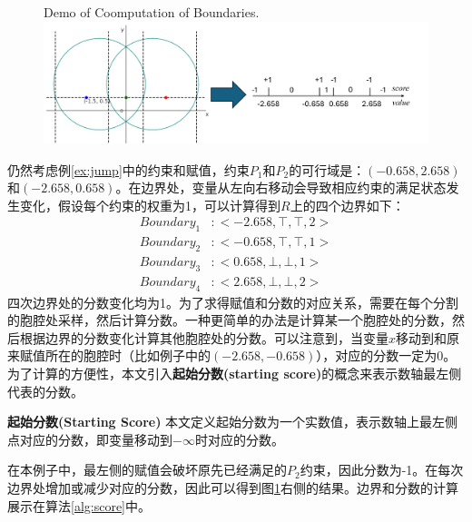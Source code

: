 \begin{example}
\label{ex:jump2}
\begin{figure}[t]
    \centering
     {Demo of Coomputation of Boundaries.}
    \includegraphics[width=\columnwidth]{Img/boundary.png}
\label{fig:boundary}
\end{figure}

仍然考虑例\ref{ex:jump}中的约束和赋值，约束$P_1$和$P_2$的可行域是：$(-0.658, 2.658)$和$(-2.658, 0.658)$。在边界处，变量从左向右移动会导致相应约束的满足状态发生变化，假设每个约束的权重为1，可以计算得到$R$上的四个边界如下：
\begin{align}
Boundary_1 &: <-2.658, \top, \top, 2> \nonumber \\
Boundary_2 &: <-0.658, \top, \top, 1> \nonumber \\
Boundary_3 &: <0.658, \bot, \bot, 1> \nonumber \\
Boundary_4 &: <2.658, \bot, \bot, 2> \nonumber
\end{align}
四次边界处的分数变化均为1。为了求得赋值和分数的对应关系，需要在每个分割的胞腔处采样，然后计算分数。一种更简单的办法是计算某一个胞腔处的分数，然后根据边界的分数变化计算其他胞腔处的分数。可以注意到，当变量$x$移动到和原来赋值所在的胞腔时（比如例子中的$(-2.658, -0.658)$），对应的分数一定为0。为了计算的方便性，本文引入\textbf{起始分数(starting score)}的概念来表示数轴最左侧代表的分数。

\begin{definition}{\textbf{起始分数(Starting Score)}}
本文定义起始分数为一个实数值，表示数轴上最左侧点对应的分数，即变量移动到$-\infty$时对应的分数。
\end{definition}
在本例子中，最左侧的赋值会破坏原先已经满足的$P_2$约束，因此分数为-1。在每次边界处增加或减少对应的分数，因此可以得到图\ref{fig:boundary}右侧的结果。边界和分数的计算展示在算法\ref{alg:score}中。
\end{example}

